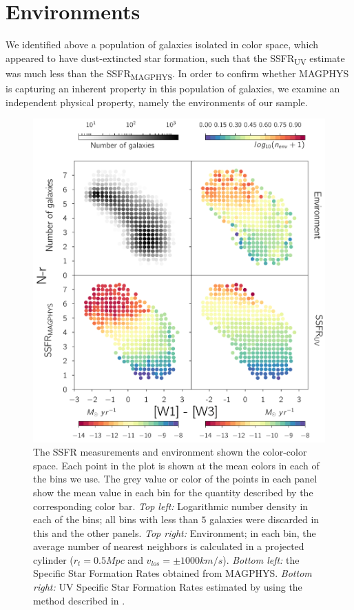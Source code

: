 \section{Environments}

We identified above a population of galaxies isolated in color space, which appeared to have dust-extincted star formation, such that the SSFR\textsubscript{UV} estimate was much less than the SSFR\textsubscript{MAGPHYS}. In order to confirm whether MAGPHYS is capturing an inherent property in this population of galaxies, we examine an independent physical property, namely the environments of our sample.\\

\begin{figure}
\includegraphics[width=\textwidth]{figures/1_panel_plot.pdf}
\caption[Short figure name.]{The SSFR measurements and environment shown the color-color 
    space. Each point in the plot is shown at the mean colors in each of 
    the bins we use. The grey value or color of the points in each
    panel show the mean value in each bin for the quantity described 
    by the corresponding  color bar.
    \emph{Top left:} Logarithmic number density in each of the 
    bins; all bins with less than $5$ galaxies were discarded in this 
    and the other panels. \emph{Top right:} Environment; in each bin, 
    the average number of nearest neighbors is calculated in a 
    projected cylinder ($r_{t} = 0.5 Mpc$ and $v_{los} = \pm 1000 km/s$). 
    \emph{Bottom left:} the Specific Star Formation Rates obtained from 
    MAGPHYS. \emph{Bottom right:} UV Specific Star Formation Rates 
    estimated by using the method described in \citet{salim_uv_2007}.
\label{fig:myInlineFigure}}
\end{figure}

